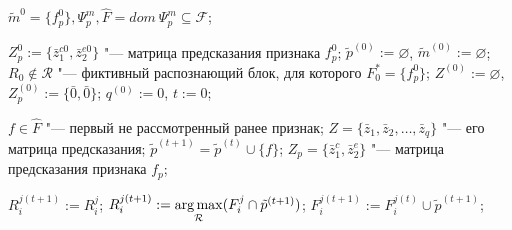 	\Require $\tilde m^0=\{f_p^0\}, \Psi_p^m, \hat F=dom\ \Psi_p^m\subseteq \mathcal F$;

	\State $Z_p^0 := \{\bar z_1^{c0},\bar z_2^{e0}\}$ "--- матрица предсказания признака $f_p^0$;
	\State $\tilde p^{(0)} := \varnothing$, $\tilde m^{(0)} := \varnothing$;
	\State $R_0\not\in\mathcal R$ "--- фиктивный распознающий блок, для которого $F_0^*=\{f_p^0\}$;
	\State $Z^{(0)} := \varnothing$, $Z_p^{(0)} := \{\bar 0, \bar 0\}$;
	\State $q^{(0)} := 0$, $t := 0$;
	
		\State $f\in\hat F$ "--- первый не рассмотренный ранее признак; 
		\State $Z=\{\bar z_1,\bar z_2,\dots,\bar z_q\}$ "--- его матрица предсказания;
		\label{alst:find_m}
			\State $\tilde p^{(t+1)}=\tilde p^{(t)}\cup\{f\}$;
			\State $Z_p=\{\bar z_1^{c},\bar z_2^{e}\}$ "--- матрица предсказания признака $f_p$;
	
				\State $R_i^{j(t+1)}:=R_i^j$;
			\Else
				\State $R_i^{j(t+1)}:=\operatorname*{arg\,max}\limits_{\mathcal R} (F_i^j\cap\tilde p^{(t+1)})$;
				\State $F_i^{j(t+1)}:=F_i^{j(t)}\cup\tilde p^{(t+1)}$;
			\EndIf
